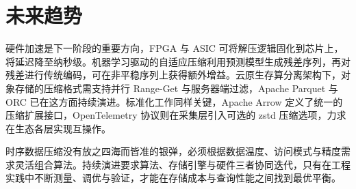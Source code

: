 \chapter{未来趋势}
硬件加速是下一阶段的重要方向，FPGA 与 ASIC 可将解压逻辑固化到芯片上，将延迟降至纳秒级。机器学习驱动的自适应压缩利用预测模型生成残差序列，再对残差进行传统编码，可在非平稳序列上获得额外增益。云原生存算分离架构下，对象存储的压缩格式需支持并行 Range-Get 与服务器端过滤，Apache Parquet 与 ORC 已在这方面持续演进。标准化工作同样关键，Apache Arrow 定义了统一的压缩扩展接口，OpenTelemetry 协议则在采集层引入可选的 zstd 压缩选项，力求在生态各层实现互操作。\par
时序数据压缩没有放之四海而皆准的银弹，必须根据数据温度、访问模式与精度需求灵活组合算法。持续演进要求算法、存储引擎与硬件三者协同迭代，只有在工程实践中不断测量、调优与验证，才能在存储成本与查询性能之间找到最优平衡。\par
